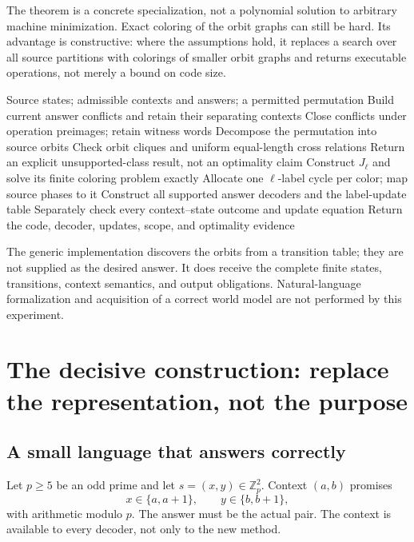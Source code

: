 \documentclass[11pt,letterpaper]{article}
\theoremstyle{remark}\newtheorem{remark}{Remark}[section]
\begin{document}
The theorem is a concrete specialization, not a polynomial solution to arbitrary machine minimization. Exact coloring of the orbit graphs can still be hard. Its advantage is constructive: where the assumptions hold, it replaces a search over all source partitions with colorings of smaller orbit graphs and returns executable operations, not merely a bound on code size.

\begin{algorithm}[htbp]\small
\caption{Construct a canonical reasoning interface: implemented orbit backend}\label{alg:compile}
\begin{algorithmic}[1]
\Require Source states; admissible contexts and answers; a permitted permutation
\State Build current answer conflicts and retain their separating contexts
\State Close conflicts under operation preimages; retain witness words
\State Decompose the permutation into source orbits
\State Check orbit cliques and uniform equal-length cross relations
  \State Return an explicit unsupported-class result, not an optimality claim
\EndIf
{}
  \State Construct $J_\ell$ and solve its finite coloring problem exactly
  \State Allocate one $\ell$-label cycle per color; map source phases to it
\EndFor
\State Construct all supported answer decoders and the label-update table
\State Separately check every context--state outcome and update equation
\State Return the code, decoder, updates, scope, and optimality evidence
\end{algorithmic}
\end{algorithm}

The generic implementation discovers the orbits from a transition table; they are not supplied as the desired answer. It does receive the complete finite states, transitions, context semantics, and output obligations. Natural-language formalization and acquisition of a correct world model are not performed by this experiment.

\section{The decisive construction: replace the representation, not the purpose}
\label{sec:retirement}
\subsection{A small language that answers correctly}
Let $p\ge5$ be an odd prime and let $s=(x,y)\in\mathbb Z_p^2$. Context $(a,b)$ promises
\begin{equation}
 x\in\{a,a+1\},\qquad y\in\{b,b+1\},\label{eq:context}
\end{equation}
with arithmetic modulo $p$. The answer must be the actual pair. The context is available to every decoder, not only to the new method.
\end{document}
